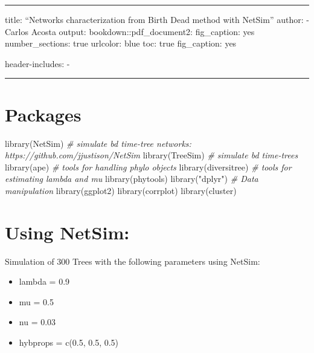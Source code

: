 \documentclass[
]{article}
\author{}
\date{\vspace{-2.5em}}
\newenvironment{Shaded}{\begin{snugshade}}{\end{snugshade}}
\newcommand{\CommentTok}[1]{\textcolor[rgb]{0.56,0.35,0.01}{\textit{#1}}}
\newcommand{\FunctionTok}[1]{\textcolor[rgb]{0.00,0.00,0.00}{#1}}
\newcommand{\NormalTok}[1]{#1}
\newcommand{\StringTok}[1]{\textcolor[rgb]{0.31,0.60,0.02}{#1}}
\providecommand{\tightlist}{%
  \setlength{\itemsep}{0pt}\setlength{\parskip}{0pt}}
\begin{document}
\begin{center}\rule{0.5\linewidth}{0.5pt}\end{center}

title: ``Networks characterization from Birth Dead method with NetSim''
author: - Carlos Acosta output: bookdown::pdf\_document2: fig\_caption:
yes number\_sections: true urlcolor: blue toc: true fig\_caption: yes

header-includes: -

\usepackage{float}

\begin{center}\rule{0.5\linewidth}{0.5pt}\end{center}

\hypertarget{packages}{%
\section{Packages}\label{packages}}

\begin{Shaded}
\begin{Highlighting}[]
\FunctionTok{library}\NormalTok{(NetSim)  }\CommentTok{\# simulate bd time{-}tree networks: https://github.com/jjustison/NetSim}
\FunctionTok{library}\NormalTok{(TreeSim)  }\CommentTok{\# simulate bd time{-}trees}
\FunctionTok{library}\NormalTok{(ape)  }\CommentTok{\# tools for handling phylo objects}
\FunctionTok{library}\NormalTok{(diversitree)  }\CommentTok{\# tools for estimating lambda and mu}
\FunctionTok{library}\NormalTok{(phytools)}
\FunctionTok{library}\NormalTok{(}\StringTok{"dplyr"}\NormalTok{)  }\CommentTok{\# Data manipulation}
\FunctionTok{library}\NormalTok{(ggplot2)}
\FunctionTok{library}\NormalTok{(corrplot)}
\FunctionTok{library}\NormalTok{(cluster)}
\end{Highlighting}
\end{Shaded}

\hypertarget{using-netsim}{%
\section{Using NetSim:}\label{using-netsim}}

Simulation of 300 Trees with the following parameters using NetSim:

\begin{itemize}
\tightlist
\item
  lambda = 0.9
\item
  mu = 0.5
\item
  nu = 0.03
\item
  hybprops = c(0.5, 0.5, 0.5)
\end{itemize}
\end{document}
